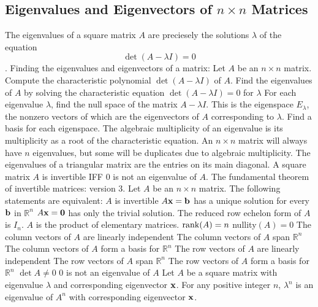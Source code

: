\documentclass{article}
\begin{document}
    \subsection{Eigenvalues and Eigenvectors of $n\times n$ Matrices}
    \begin{outline}
        \1 The eigenvalues of a square matrix $A$ are preciesely the solutions \(\lambda\) of the equation \[\det (A-\lambda I) = 0\]. 
        \1 Finding the eigenvalues and eigenvectors of a matrix: Let $A$ be an \(n\times n\) matrix. 
            \2 Compute the characteristic polynomial \(\det (A-\lambda I)\) of $A$. 
            \2 Find the eigenvalues of $A$ by solving the characteristic equation \(\det (A-\lambda I)=0\) for \(\lambda\)
            \2 For each eigenvalue \(\lambda\), find the null space of the matrix \(A-\lambda I\). This is the eigenspace \(E_\lambda\), the nonzero vectors of which are the eigenvectors of $A$ corresponding to \(\lambda\). 
            \2 Find a basis for each eigenspace. 
        \1 The algebraic multiplicity of an eigenvalue is its multiplicity as a root of the characteristic equation. An \(n\times n\) matrix will always have $n$ eigenvalues, but some will be duplicates due to algebraic multiplicity. 
        \1 The eigenvalues of a triangular matrix are the entries on its main diagonal. 
        \1 A square matrix $A$ is invertible IFF $0$ is not an eigenvalue of $A$. 
        \1 The fundamental theorem of invertible matrices: version 3. Let $A$ be an $n\times n$ matrix. The following statements are equivalent: 
            \2 $A$ is invertible
            \2 $A\vb x=\vb b$ has a unique solution for every \(\vb b\) in \(\mathbb R^n\)
            \2 \(A\vb x=\vb 0\) has only the trivial solution. 
            \2 The reduced row echelon form of $A$ is \(I_n\). 
            \2 $A$ is the product of elementary matrices. 
            \2 \(\rank (A)=n\)
            \2 nullity\((A)=0\)
            \2 The column vectors of $A$ are linearly independent
            \2 The column vectors of $A$ span \(\mathbb R^n\)
            \2 The column vectors of $A$ form a basis for \(\mathbb R^n\)
            \2 The row vectors of $A$ are linearly independent
            \2 The row vectors of $A$ span \(\mathbb R^n\)
            \2 The row vectors of $A$ form a basis for \(\mathbb R^n\)
            \2 \(\det A\neq 0\)
            \2 $0$ is not an eigenvalue of $A$
        \1 Let $A$ be a square matrix with eigenvalue \(\lambda\) and corresponding eigenvector \(\vb x\). 
            \2 For any positive integer $n$, \(\lambda ^n\) is an eigenvalue of \(A^n\) with corresponding eigenvector \(\vb x\). 

\end{outline}
\end{document}
